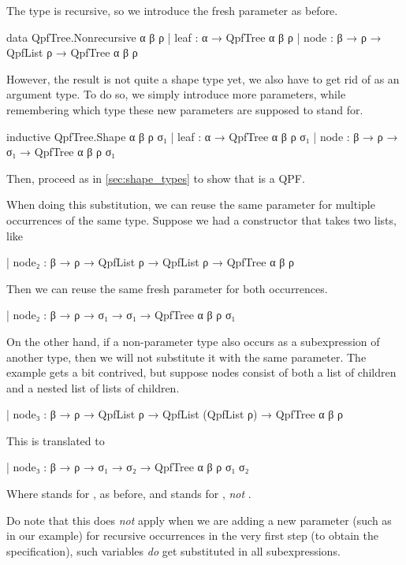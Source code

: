 The type is recursive, so we introduce the fresh parameter as before.
\begin{leancode}
  data QpfTree.Nonrecursive α β ρ
    | leaf : α → QpfTree α β ρ
    | node : β → ρ → QpfList ρ → QpfTree α β ρ
\end{leancode}

However, the result is not quite a shape type yet, we also have to get rid of  as an
argument type. To do so, we simply introduce more parameters, while remembering which type these
new parameters are supposed to stand for.

\begin{leancode}
  inductive QpfTree.Shape α β ρ σ₁
    | leaf : α → QpfTree α β ρ σ₁
    | node : β → ρ → σ₁ → QpfTree α β ρ σ₁
\end{leancode}

Then, proceed as in \cref{sec:shape_types} to show that  is a QPF.

\begin{remark}
  When doing this substitution, we can reuse the same parameter for multiple occurrences of the same type.
  Suppose we had a constructor that takes two lists, like
  \begin{leancode}
    | node₂ : β → ρ → QpfList ρ → QpfList ρ → QpfTree α β ρ
  \end{leancode}
  Then we can reuse the same fresh parameter  for both occurrences.
  \begin{leancode}
    | node₂ : β → ρ → σ₁ → σ₁ → QpfTree α β ρ σ₁
  \end{leancode}
  
  On the other hand, if a non-parameter type also occurs as a subexpression of another type, then
  we will not substitute it with the same parameter.
  The example gets a bit contrived, but suppose nodes consist of both a list of children and a nested list 
  of lists of children.
  \begin{leancode}
    | node₃ : β → ρ → QpfList ρ → QpfList (QpfList ρ) → QpfTree α β ρ
  \end{leancode}
  This is translated to
  \begin{leancode}
    | node₃ : β → ρ → σ₁ → σ₂ → QpfTree α β ρ σ₁ σ₂
  \end{leancode}
  Where  stands for , as before, and  stands for , \emph{not} .    
  
  Do note that this does \emph{not} apply when we are adding a new parameter (such as  in our example) for recursive occurrences in the very first step (to obtain the  specification), such variables \emph{do} get substituted in all subexpressions.
  \end{remark}

